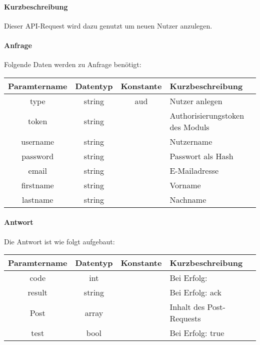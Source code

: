 \paragraph{Kurzbeschreibung}Dieser API-Request wird dazu genutzt um neuen Nutzer anzulegen.
\paragraph{Anfrage}Folgende Daten werden zu Anfrage benötigt:
\begin{table}[H]
	\begin{tabular}{|c|c|c|p{6.5cm}|}
		\hline
		\textbf{Paramtername} & \textbf{Datentyp} & \textbf{Konstante} & \textbf{Kurzbeschreibung}                                                                                               \\ \hline
		type                & string            & aud                & Nutzer anlegen \\ \hline
		token               & string            &                    & Authorisierungstoken des Moduls \\ \hline
		username            & string            &                    & Nutzername \\ \hline
		password            & string            &                    & Passwort als Hash \\ \hline
		email               & string            &                    & E-Mailadresse \\ \hline
		firstname           & string            &                    & Vorname \\ \hline
		lastname            & string            &                    & Nachname \\ \hline
	\end{tabular}
\end{table}
\paragraph{Antwort}Die Antwort ist wie folgt aufgebaut:
\begin{table}[H]
	\begin{tabular}{|c|c|c|p{6.5cm}|}
		\hline
		\textbf{Paramtername} & \textbf{Datentyp} & \textbf{Konstante} & \textbf{Kurzbeschreibung}            \\ \hline                
		code                & int              &                 & Bei Erfolg: {\glqq 0\grqq} \\ \hline
		result              & string           &                 & Bei Erfolg: {\glqq ack\grqq} \\ \hline
		Post                & array            &                 & Inhalt des Post-Requests \\ \hline
		test                & bool             &                 & Bei Erfolg: {\glqq true\grqq} \\ \hline
	\end{tabular}
\end{table}
